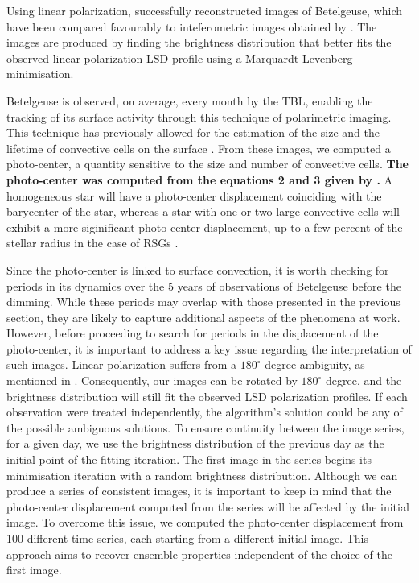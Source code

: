 \documentclass{aa}
\begin{document}
Using linear polarization, \cite{lopez_ariste_convective_2018} successfully reconstructed images of Betelgeuse, which have been compared favourably to inteferometric images obtained by \cite{montarges_close_2016}. The images are produced by finding the brightness distribution that better fits the observed linear 
polarization LSD profile using a Marquardt-Levenberg minimisation.

Betelgeuse is observed, on average, every month by the TBL, enabling the tracking of its surface activity through this technique of polarimetric imaging. This technique has previously allowed for the estimation of  the size and the
 lifetime of convective cells on the surface \citep{lopez_ariste_convective_2018}. From these images, we computed a photo-center, a quantity sensitive to the size and number of convective cells. \textbf{The photo-center was computed from the equations 2 and 3 given by \cite{chiavassa_probing_2022}.} 
A homogeneous star will have a photo-center displacement coinciding with the barycenter of the star, whereas a star with one or two large convective cells will exhibit a more siginificant photo-center displacement, up to a few percent of the stellar radius in the case of RSGs \citep{chiavassa_probing_2022}. 

Since the photo-center is linked to surface convection, it is worth checking for periods in its 
dynamics over the 5 years of observations of Betelgeuse before the dimming. While these periods may overlap with those presented in the previous section, they are likely to capture additional aspects of the phenomena at work.
However, before proceeding to search for periods in the displacement of the photo-center, it is important to address a key issue regarding the interpretation of such images. 
Linear polarization suffers from a $180 ^\circ$ degree ambiguity, as mentioned in \cite{auriere_discovery_2016}. Consequently, our images 
can be 
rotated by $180^\circ$ degree, and the brightness distribution will still fit the observed LSD polarization profiles. 
If each observation were treated independently, the algorithm's solution could be any of the possible ambiguous solutions. To ensure continuity 
between the image series, 
for a given day, we use the brightness distribution of the previous day as the initial point 
of the  fitting iteration. The first image in the series begins its minimisation iteration with a random brightness distribution. 
Although we can produce a series of consistent images, it is important to keep in mind that the photo-center displacement computed from the series 
will be affected by the initial image. 
To overcome this issue, we computed
the photo-center displacement from 100 different time series, each starting from a different initial image. This approach aims to recover ensemble properties independent of the choice of the first image. 
\end{document}
